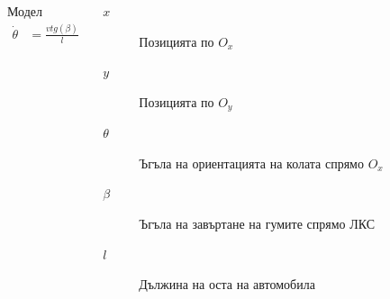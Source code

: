 \documentclass[hyperref=unicode]{beamer}
\begin{document}
\begin{frame}
\begin{columns}
{{\begin{block}{Модел}
\begin{align*}
                \dot{\theta} &= \frac{v tg(\beta)}{l}
              \end{align*}
            \end{block}}
      \tiny{\begin{description}
              \item[$x$]{Позицията по $O_x$}
              \item[$y$]{Позицията по $O_y$}
              \item[$\theta$]{Ъгъла на ориентацията на колата спрямо $O_x$}
              \item[$\beta$]{Ъгъла на завъртане на гумите спрямо ЛКС}
              \item[$l$]{Дължина на оста на автомобила}
            \end{description}}}
      \end{columns}
    \end{frame}
\end{document}

